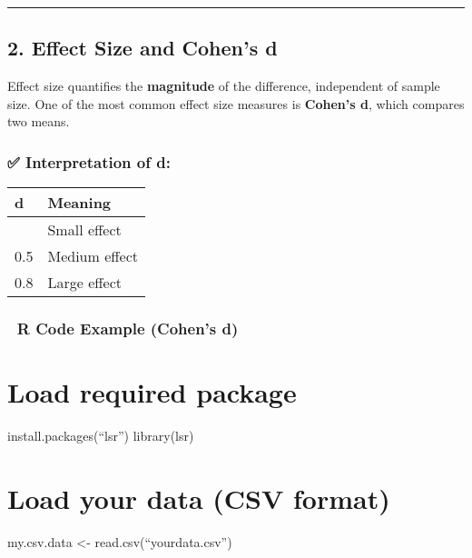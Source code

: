 \documentclass[
  letterpaper,
  DIV=11,
  numbers=noendperiod]{scrreprt}
\begin{document}
{\begin{center}\rule{0.5\linewidth}{0.5pt}\end{center}

\section{2. Effect Size and Cohen's d}\label{effect-size-and-cohens-d}

Effect size quantifies the \textbf{magnitude} of the difference,
independent of sample size. One of the most common effect size measures
is \textbf{Cohen's d}, which compares two means.

\subsection{✅ Interpretation of d:}\label{interpretation-of-d}

\begin{longtable}[]{@{}ll@{}}
\toprule\noalign{}
d & Meaning \\
\midrule\noalign{}
\endhead
\bottomrule\noalign{}
\endlastfoot
0.2 & Small effect \\
0.5 & Medium effect \\
0.8 & Large effect \\
\end{longtable}

\subsection{📌 R Code Example (Cohen's
d)}\label{r-code-example-cohens-d}


\chapter{Load required package}\label{load-required-package}

install.packages(``lsr'') library(lsr)


\chapter{Load your data (CSV format)}\label{load-your-data-csv-format}

my.csv.data \textless- read.csv(``yourdata.csv'')


}
\end{document}
